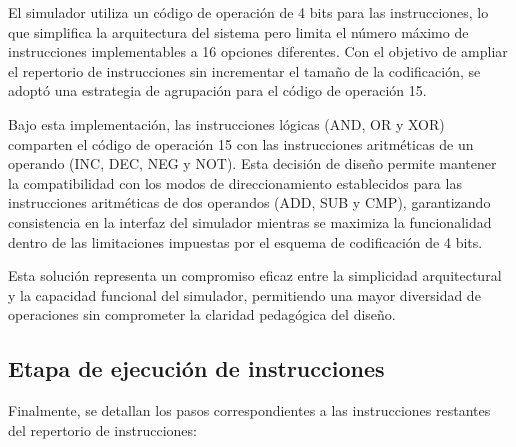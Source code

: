 \documentclass[12pt,oneside]{templates/unerthesis}
\begin{document}
El simulador utiliza un código de operación de 4 bits para las instrucciones, lo que simplifica la arquitectura del sistema pero limita el número máximo de instrucciones implementables a 16 opciones diferentes. Con el objetivo de ampliar el repertorio de instrucciones sin incrementar el tamaño de la codificación, se adoptó una estrategia de agrupación para el código de operación 15.

Bajo esta implementación, las instrucciones lógicas (AND, OR y XOR) comparten el código de operación 15 con las instrucciones aritméticas de un operando (INC, DEC, NEG y NOT). Esta decisión de diseño permite mantener la compatibilidad con los modos de direccionamiento establecidos para las instrucciones aritméticas de dos operandos (ADD, SUB y CMP), garantizando consistencia en la interfaz del simulador mientras se maximiza la funcionalidad dentro de las limitaciones impuestas por el esquema de codificación de 4 bits.

Esta solución representa un compromiso eficaz entre la simplicidad arquitectural y la capacidad funcional del simulador, permitiendo una mayor diversidad de operaciones sin comprometer la claridad pedagógica del diseño.

\hypertarget{etapa-de-ejecuciuxf3n-de-instrucciones}{%
\subsection{Etapa de ejecución de instrucciones}\label{etapa-de-ejecuciuxf3n-de-instrucciones}}

Finalmente, se detallan los pasos correspondientes a las instrucciones restantes del repertorio de instrucciones:
\end{document}
